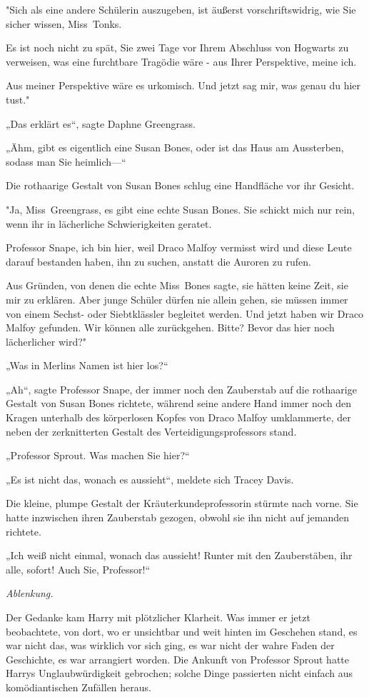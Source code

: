 {"Sich als eine andere Schülerin auszugeben, ist äußerst vorschriftswidrig, wie Sie sicher wissen, Miss~Tonks.

Es ist noch nicht zu spät, Sie zwei Tage vor Ihrem Abschluss von Hogwarts zu verweisen, was eine furchtbare Tragödie wäre - aus Ihrer Perspektive, meine ich.

Aus meiner Perspektive wäre es urkomisch. Und jetzt sag mir, was genau du hier tust."

„Das erklärt es“, sagte Daphne Greengrass.

„Ähm, gibt es eigentlich eine Susan Bones, oder ist das Haus am Aussterben, sodass man Sie heimlich—“

Die rothaarige Gestalt von Susan Bones schlug eine Handfläche vor ihr Gesicht.

"Ja, Miss~Greengrass, es gibt eine echte Susan Bones. Sie schickt mich nur rein, wenn ihr in lächerliche Schwierigkeiten geratet.

Professor Snape, ich bin hier, weil Draco Malfoy vermisst wird und diese Leute darauf bestanden haben, ihn zu suchen, anstatt die Auroren zu rufen.

Aus Gründen, von denen die echte Miss~Bones sagte, sie hätten keine Zeit, sie mir zu erklären. Aber junge Schüler dürfen nie allein gehen, sie müssen immer von einem Sechst- oder Siebtklässler begleitet werden. Und jetzt haben wir Draco Malfoy gefunden. Wir können alle zurückgehen. Bitte? Bevor das hier noch lächerlicher wird?"

„Was in Merlins Namen ist hier los?“

„Ah“, sagte Professor Snape, der immer noch den Zauberstab auf die rothaarige Gestalt von Susan Bones richtete, während seine andere Hand immer noch den Kragen unterhalb des körperlosen Kopfes von Draco Malfoy umklammerte, der neben der zerknitterten Gestalt des Verteidigungsprofessors stand.

„Professor Sprout. Was machen Sie hier?“

„Es ist nicht das, wonach es aussieht“, meldete sich Tracey Davis.

Die kleine, plumpe Gestalt der Kräuterkundeprofessorin stürmte nach vorne. Sie hatte inzwischen ihren Zauberstab gezogen, obwohl sie ihn nicht auf jemanden richtete.

„Ich weiß nicht einmal, wonach das aussieht! Runter mit den Zauberstäben, ihr alle, sofort! Auch Sie, Professor!“

\emph{Ablenkung.}

Der Gedanke kam Harry mit plötzlicher Klarheit. Was immer er jetzt beobachtete, von dort, wo er unsichtbar und weit hinten im Geschehen stand, es war nicht das, was wirklich vor sich ging, es war nicht der wahre Faden der Geschichte, es war arrangiert worden. Die Ankunft von Professor Sprout hatte Harrys Unglaubwürdigkeit gebrochen; solche Dinge passierten nicht einfach aus komödiantischen Zufällen heraus.

}
